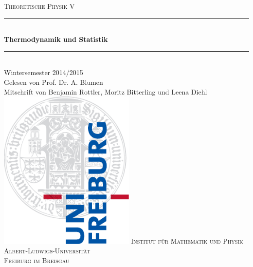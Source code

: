 \newcommand{\HRule}{\rule{\linewidth}{0.5mm}}
\begin{titlepage}
\begin{center}
  \textsc{\Large Theoretische Physik V}\\[0.5cm]
  \HRule \\[0.4cm]
  { \huge \bfseries Thermodynamik und Statistik}\\
  \HRule \\[0.5cm]
  \large Wintersemester 2014/2015 \\[0.5cm]  
  Gelesen von Prof. Dr. A. Blumen \\
  Mitschrift von Benjamin Rottler, Moritz Bitterling und Leena Diehl \\[2.5cm]
  \includegraphics[height=8cm]{../img/logo_uni.pdf}
  \vfill
  \normalsize
  \textsc{Institut für Mathematik und Physik} \\
  \textsc{Albert-Ludwigs-Universität} \\
  \textsc{Freiburg im Breisgau}
\end{center}
\end{titlepage}